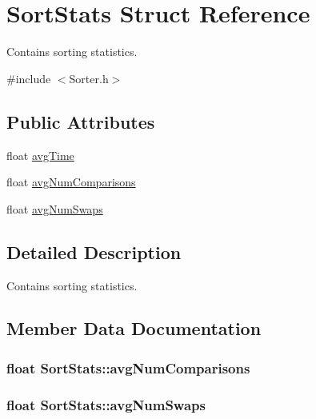 \hypertarget{struct_sort_stats}{}\section{Sort\+Stats Struct Reference}
\label{struct_sort_stats}


Contains sorting statistics.  




{\ttfamily \#include $<$Sorter.\+h$>$}

\subsection*{Public Attributes}
\begin{DoxyCompactItemize}
\item 
float \hyperlink{struct_sort_stats_a07d8638cfe1302952cb20a607afc8e39}{avg\+Time}
\item 
float \hyperlink{struct_sort_stats_a7566917dde7a1cfefbe2775c858413c1}{avg\+Num\+Comparisons}
\item 
float \hyperlink{struct_sort_stats_a0ce1570721d9b686f9fa0adb164689df}{avg\+Num\+Swaps}
\end{DoxyCompactItemize}


\subsection{Detailed Description}
Contains sorting statistics. 

\subsection{Member Data Documentation}
\subsubsection[{\texorpdfstring{avg\+Num\+Comparisons}{avgNumComparisons}}]{\setlength{\rightskip}{0pt plus 5cm}float Sort\+Stats\+::avg\+Num\+Comparisons}\hypertarget{struct_sort_stats_a7566917dde7a1cfefbe2775c858413c1}{}\label{struct_sort_stats_a7566917dde7a1cfefbe2775c858413c1}
\subsubsection[{\texorpdfstring{avg\+Num\+Swaps}{avgNumSwaps}}]{\setlength{\rightskip}{0pt plus 5cm}float Sort\+Stats\+::avg\+Num\+Swaps}\hypertarget{struct_sort_stats_a0ce1570721d9b686f9fa0adb164689df}{}\label{struct_sort_stats_a0ce1570721d9b686f9fa0adb164689df}
